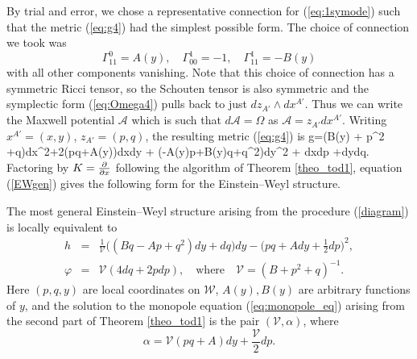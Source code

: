 By trial and error, we chose a representative connection for (\ref{eq:1symode}) such that the metric (\ref{eq:g4}) had the simplest possible form. The choice of connection we took was
\[
\Gamma^{0}_{11}=A(y),\quad \Gamma^{1}_{00}=-1, \quad \Gamma^{1}_{11}=-B(y)
\]
with all other components vanishing. Note that this choice of connection has a symmetric Ricci tensor, so the Schouten tensor is also symmetric and the symplectic form (\ref{eq:Omega4}) pulls back to just $dz_{A'}\wedge dx^{A'}$. Thus we can write the Maxwell potential $\mathcal{A}$ which is such that $d\mathcal{A}=\Omega$ as $\mathcal{A}=z_{A'}dx^{A'}$. Writing $x^{A'}=(x,y)$, $z_{A'}=(p,q)$, the resulting metric (\ref{eq:g4}) is
\be
\label{einstein_1}
g=(B(y) + p^2 +q)dx^2+2(pq+A(y))dxdy + (-A(y)p+B(y)q+q^2)dy^2 + dxdp +dydq.
\ee
Factoring by $K=\frac{\partial}{\partial x}$ following the algorithm of Theorem
\ref{theo_tod1}, equation (\ref{EWgen}) gives the following form for the Einstein--Weyl structure.
\begin{prop}
\label{prop1}
The most general  Einstein--Weyl structure arising
from the procedure (\ref{diagram}) is locally equivalent to
\begin{eqnarray}
\label{ew_final}
h&=&\frac{1}{\mathscr{V}}\big((Bq -Ap+ q^2)dy+dq\big)dy
-\Big({pq+A}dy+\frac{1}{2}dp\Big)^2, \label{genh} \\
\varphi&=&\mathscr{V}(4dq+2 pdp), \quad\mbox{where}\quad \mathscr{V}=
({B}+ p^2+q)^{-1}.\nonumber
\end{eqnarray}
Here $(p, q, y)$ are local coordinates on $\mathcal{W}$, $A(y), B(y)$ are arbitrary functions of $y$, and the solution to the monopole equation (\ref{eq:monopole_eq}) arising from the second part of Theorem \ref{theo_tod1} is the pair $(\mathscr{V},\alpha)$, where
\[
\alpha=\mathscr{V}( pq+A)dy+\frac{\mathscr{V}}{2}dp.
\]
\end{prop}


